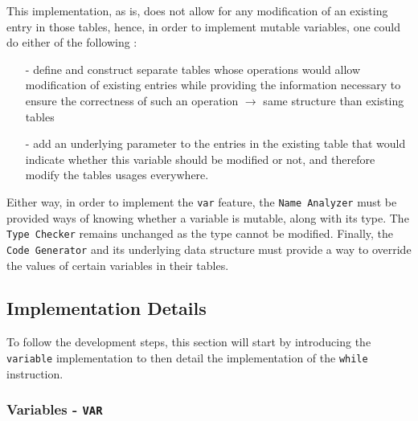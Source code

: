 This implementation, as is, does not allow for any modification of an existing entry in those tables, hence, in order to implement mutable variables, one could do either of the following :
\begin{itemize}
    \item[-] define and construct separate tables whose operations would allow modification of existing entries while providing the information necessary to ensure the correctness of such an operation $\rightarrow$ same structure than existing tables
    \item[-] add an underlying parameter to the entries in the existing table that would indicate whether this variable should be modified or not, and therefore modify the tables usages everywhere.
\end{itemize}

Either way, in order to implement the \texttt{var} feature, the \texttt{Name Analyzer} must be provided ways of knowing whether a variable is mutable, along with its type. The \texttt{Type Checker} remains unchanged as the type cannot be modified. Finally, the \texttt{Code Generator} and its underlying data structure must provide a way to override the values of certain variables in their tables.

\subsection{Implementation Details}

To follow the development steps, this section will start by introducing the \texttt{variable} implementation to then detail the implementation of the \texttt{while} instruction.

\subsubsection{Variables - \texttt{VAR}}

